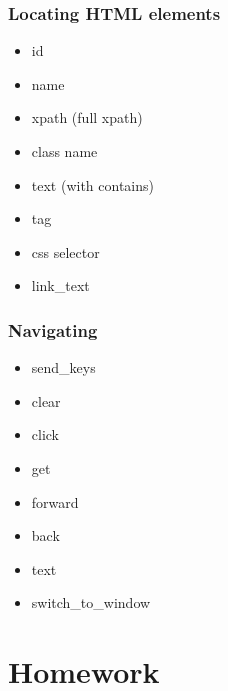 \documentclass{beamer}
\begin{document}
\begin{frame}
    \frametitle{Locating HTML elements}
    \begin{itemize}
        \item id
        \item name
        \item xpath (full xpath)
        \item class name
        \item text (with contains)
        \item tag
        \item css selector
        \item link\_text
    \end{itemize}
\end{frame}

\begin{frame}
    \frametitle{Navigating}
    \begin{itemize}
        \item send\_keys
        \item clear
        \item click
        \item get
        \item forward
        \item back
        \item text
        \item switch\_to\_window
    \end{itemize}
\end{frame}

\section{Homework} 
\end{document}
